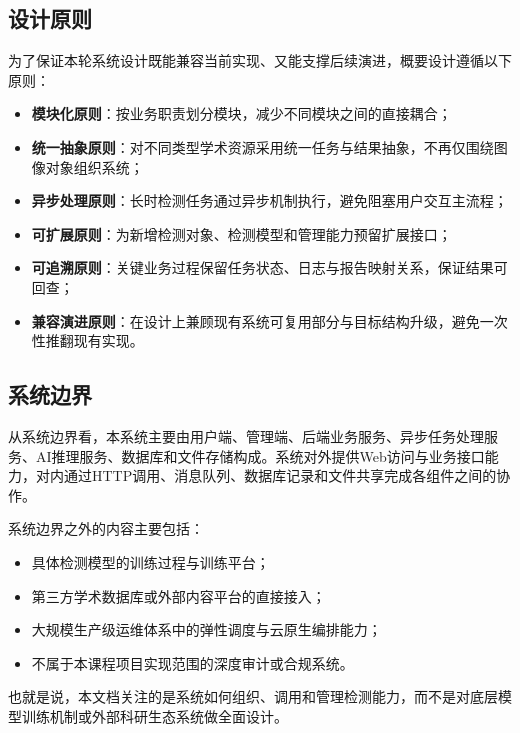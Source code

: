 \subsection{设计原则}
为了保证本轮系统设计既能兼容当前实现、又能支撑后续演进，概要设计遵循以下原则：
\begin{itemize}[leftmargin=2em]
    \item \textbf{模块化原则}：按业务职责划分模块，减少不同模块之间的直接耦合；
    \item \textbf{统一抽象原则}：对不同类型学术资源采用统一任务与结果抽象，不再仅围绕图像对象组织系统；
    \item \textbf{异步处理原则}：长时检测任务通过异步机制执行，避免阻塞用户交互主流程；
    \item \textbf{可扩展原则}：为新增检测对象、检测模型和管理能力预留扩展接口；
    \item \textbf{可追溯原则}：关键业务过程保留任务状态、日志与报告映射关系，保证结果可回查；
    \item \textbf{兼容演进原则}：在设计上兼顾现有系统可复用部分与目标结构升级，避免一次性推翻现有实现。
\end{itemize}

\subsection{系统边界}
从系统边界看，本系统主要由用户端、管理端、后端业务服务、异步任务处理服务、AI推理服务、数据库和文件存储构成。系统对外提供Web访问与业务接口能力，对内通过HTTP调用、消息队列、数据库记录和文件共享完成各组件之间的协作。

系统边界之外的内容主要包括：
\begin{itemize}[leftmargin=2em]
    \item 具体检测模型的训练过程与训练平台；
    \item 第三方学术数据库或外部内容平台的直接接入；
    \item 大规模生产级运维体系中的弹性调度与云原生编排能力；
    \item 不属于本课程项目实现范围的深度审计或合规系统。
\end{itemize}

也就是说，本文档关注的是系统如何组织、调用和管理检测能力，而不是对底层模型训练机制或外部科研生态系统做全面设计。
